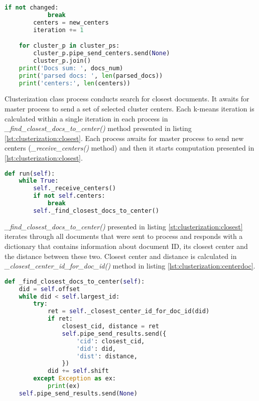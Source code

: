 \begin{lstlisting}[language=Python, caption={Main.cluster() - Main process method for conducting clustering}, label={lst:main:cluster}]
        if not changed:
            break
        centers = new_centers
        iteration += 1

    for cluster_p in cluster_ps:
        cluster_p.pipe_send_centers.send(None)
        cluster_p.join()
    print('Docs sum: ', docs_num)
    print('parsed docs: ', len(parsed_docs))
    print('centers:', len(centers))
\end{lstlisting}

Clusterization class process conducts search for closest documents. It awaits for master process to send a set of selected cluster centers. Each k-means iteration is calculated within a single iteration in each process in \textit{\_find\_closest\_docs\_to\_center()} method presented in listing \ref{lst:clusterization:closest}. Each process awaits for master process to send new centers (\textit{\_receive\_centers()} method) and then it starts computation presented in \ref{lst:clusterization:closest}.

\begin{lstlisting}[language=Python, caption={Clusterization.run() - Clusterization class process main method}, label={lst:clusterization:run}]
def run(self):
    while True:
        self._receive_centers()
        if not self.centers:
            break
        self._find_closest_docs_to_center()
\end{lstlisting}

\textit{\_find\_closest\_docs\_to\_center()} presented in listing \ref{st:clusterization:closest} iterates through all documents that were sent to process and responds with a dictionary that contains information about document ID, its closest center and the distance between these two. Closest center and distance is calculated in \textit{\_closest\_center\_id\_for\_doc\_id()} method in listing \ref{lst:clusterization:centerdoc}.

\begin{lstlisting}[language=Python, caption={Clusterization.\_find\_closest\_docs\_to\_center() - Finding closest center for a document during clusterization, part 1}, label={lst:clusterization:closest}]
def _find_closest_docs_to_center(self):
    did = self.offset
    while did < self.largest_id:
        try:
            ret = self._closest_center_id_for_doc_id(did)
            if ret:
                closest_cid, distance = ret
                self.pipe_send_results.send({
                    'cid': closest_cid,
                    'did': did,
                    'dist': distance,
                })
            did += self.shift
        except Exception as ex:
            print(ex)
    self.pipe_send_results.send(None)
\end{lstlisting}

